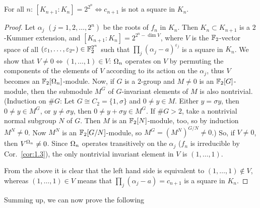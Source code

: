 \begin{sharedlemma}
  \label{lem:1.6}
  For all $n$: $[K_{n+1} : K_n] = 2^{2^n} \iff c_{n+1}$ is not a square in $K_n$.
\end{sharedlemma}
\begin{proof}
  Let $\alpha_j$ $(j = 1, 2, \dots, 2^n)$ be the roots of $f_n$ in $K_n$. Then
  $K_n \subset K_{n+1}$ is a $2$-Kummer extension, and $[K_{n+1} : K_n] = 2^{2^n - \dim V}$,
  where $V$ is the $\mathbb{F}_2$-vector space of all $(\varepsilon_1, \dots, \varepsilon_{2^n}) \in
  \mathbb{F}_2^{2^n}$ such that $\prod_j (\alpha_j - a)^{\varepsilon_j}$ is a square in $K_n$. We show
  that $V \ne 0 \iff (1, \dots, 1) \in V$: $\Omega_n$ operates on $V$ by permuting the components of
  the elements of $V$ according to its action on the $\alpha_j$, thus $V$ becomes an
  $\mathbb{F}_2[\Omega_n]$-module. Now, if $G$ is a $2$-group and $M \ne 0$ is an $\mathbb{F}_2[G]$-module, then
  the submodule $M^G$ of $G$-invariant elements of $M$ is also nontrivial. (Induction on $\#G$:
  Let $G \cong C_2 = \{1, \sigma\}$ and $0 \ne y \in M$. Either $y = \sigma y$, then
  $0 \ne y \in M^G$, or $y \ne \sigma y$, then $0 \ne y + \sigma y \in M^G$. If $\#G > 2$, take a
  nontrivial normal subgroup $N$ of $G$. Then $M$ is an $\mathbb{F}_2[N]$-module, too, so by induction
  $M^N \ne 0$. Now $M^N$ is an $\mathbb{F}_2[G/N]$-module, so $M^G = (M^N)^{G/N} \ne 0$.) So, if
  $V \ne 0$, then $V^{\Omega_n} \ne 0$. Since $\Omega_n$ operates transitively on the $\alpha_j$
  ($f_n$ is irreducible by Cor.~\ref{cor:1.3}), the only nontrivial invariant element in $V$ is
  $(1, \dots, 1)$.

  From the above it is clear that the left hand side is equivalent to
  $(1, \dots, 1) \notin V$, whereas $(1, \dots, 1) \in V$ means that
  $\prod_j (\alpha_j - a) = c_{n+1}$ is a square in $K_n$.
\end{proof}

Summing up, we can now prove the following

